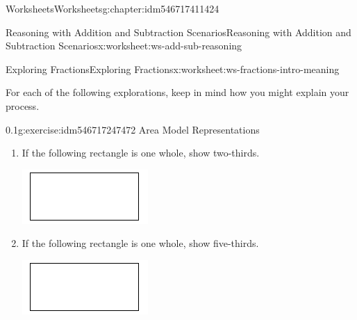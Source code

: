 \documentclass[twoside,11pt,]{book}
\begin{document}
\begin{chapterptx}{Worksheets}{}{Worksheets}{}{}{g:chapter:idm546717411424}
\begin{worksheet-section-numberless}{Reasoning with Addition and Subtraction Scenarios}{}{Reasoning with Addition and Subtraction Scenarios}{}{}{x:worksheet:ws-add-sub-reasoning}
\end{worksheet-section-numberless}
\restoregeometry
%
%
\typeout{************************************************}
\typeout{************************************************}
%
\begin{worksheet-section-numberless}{Exploring Fractions}{}{Exploring Fractions}{}{}{x:worksheet:ws-fractions-intro-meaning}
\begin{introduction}{}%
For each of the following explorations, keep in mind how you might explain your process.%
\end{introduction}%
\begin{divisionexercise}{1}{}{0.1}{g:exercise:idm546717247472}%
Area Model Representations%
%
\begin{enumerate}[label=(\alph*)]
\item{}If the following rectangle is one whole, show two-thirds. \begin{sidebyside}{1}{0.3}{0.3}{0}%
\begin{sbspanel}{0.4}%
\includegraphics[width=1\linewidth]{images/generic-rectangle.png}
\end{sbspanel}%
\end{sidebyside}%
%
\item{}If the following rectangle is one whole, show five-thirds. \begin{sidebyside}{1}{0.3}{0.3}{0}%
\begin{sbspanel}{0.4}%
\includegraphics[width=1\linewidth]{images/generic-rectangle.png}

\end{sbspanel}
\end{sidebyside}
\end{enumerate}
\end{divisionexercise}
\end{worksheet-section-numberless}
\end{chapterptx}
\end{document}

